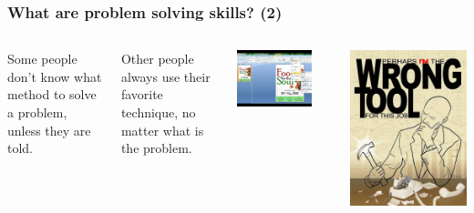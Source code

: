 \documentclass{beamer}
\begin{document}
\begin{frame}
  \frametitle{What are problem solving skills? (2)}
  \begin{columns}[T]
    
    {\small
    Some people don't know what method to solve a problem, unless they
    are told.} 

    \vspace{0.5cm}
    
    {\small
    Other people always use their favorite technique, no matter what
    is the problem.}
    
    \vspace{0.5cm}

    \begin{center}
      \includegraphics[width=0.8\textwidth]{img/powerpoint}
    \end{center}
    \includegraphics[height=0.8\textheight]{img/hammer}

\end{columns}
\end{frame}
\end{document}
